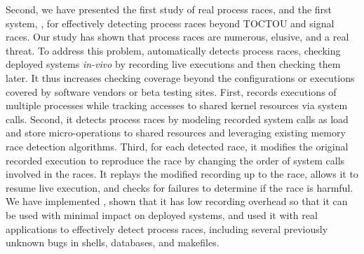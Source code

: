 Second, we have presented the first study of real process races, and the first
system, \racepro, for effectively detecting process races beyond TOCTOU
and signal races.   Our study has shown that process races are
numerous, elusive, and a real threat.  To address this problem, \racepro
automatically detects process races, checking deployed
systems \emph{in-vivo} by recording live executions and then checking
them later.  It thus increases checking coverage beyond the
configurations or executions covered by software vendors or beta
testing sites.  First, \racepro records executions of multiple processes
while tracking accesses to shared kernel resources via system
calls. Second, it detects process races by modeling recorded system
calls as load and store micro-operations to shared resources and
leveraging existing memory race detection algorithms.  Third, for each
detected race, it modifies the original recorded execution to
reproduce the race by changing the order of system calls involved in
the races.  It replays the modified recording up to the race, allows
it to resume live execution, and checks for failures to determine if
the race is harmful.  We have implemented \racepro, shown that it has
low recording overhead so that it can be used with minimal impact on
deployed systems, and used it with real applications to effectively
detect \nracepro process races, including several previously unknown
bugs in shells, databases, and makefiles.

